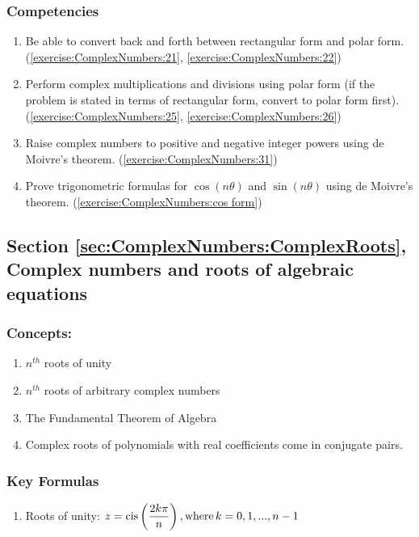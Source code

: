 \subsubsection*{Competencies}
\begin{enumerate}
\item
Be able to convert back and forth between rectangular form and polar form. (\ref{exercise:ComplexNumbers:21}, \ref{exercise:ComplexNumbers:22})
\item
Perform complex multiplications and divisions using polar form (if the problem is stated in terms of rectangular form, convert to polar form first). (\ref{exercise:ComplexNumbers:25}, \ref{exercise:ComplexNumbers:26})
\item
Raise complex numbers to positive and negative integer powers using de Moivre's theorem. (\ref{exercise:ComplexNumbers:31})
\item
Prove trigonometric formulas for $\cos(n\theta)$ and $\sin(n\theta)$ using de Moivre's theorem. (\ref{exercise:ComplexNumbers:cos form})
\end{enumerate}


\subsection*{Section \ref{sec:ComplexNumbers:ComplexRoots}, Complex numbers and roots of algebraic equations}
\subsubsection*{Concepts:}
\begin{enumerate}
\item 
$n^{th}$ roots of unity
\item
$n^{th}$ roots of arbitrary complex numbers
\item
The Fundamental Theorem of Algebra
\item
Complex roots of polynomials with real coefficients come in conjugate pairs.
\end{enumerate}

\subsubsection*{Key Formulas}
\begin{enumerate}
\item 
Roots of unity: $z = \operatorname{cis}\left(\dfrac{2k\pi}{n}\right),\text{where} \, k = 0, 1, ... , n - 1 $
\end{enumerate}

